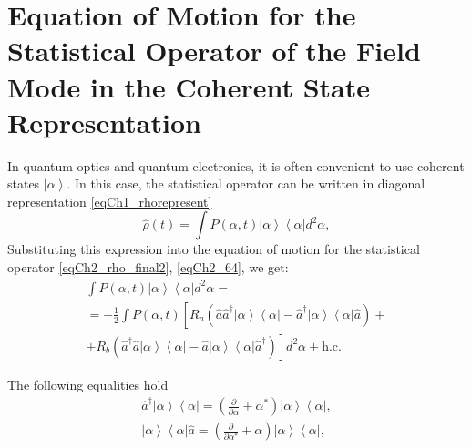 \section{Equation of Motion for the Statistical Operator of the Field Mode in the Coherent State Representation}
In quantum optics and quantum electronics, it is often convenient to use coherent states $\left|\alpha\right>$. In this case, the statistical operator can be written in diagonal representation \eqref{eqCh1_rhorepresent}  
\begin{equation}
\hat{\rho}\left(t\right) = \int
P\left(\alpha, t\right)\left|\alpha\right>\left<\alpha\right| d^2 \alpha,
\label{eqCh2_65}
\end{equation}
Substituting this expression into the equation of motion for the statistical operator \eqref{eqCh2_rho_final2}, \ref{eqCh2_64}, we get: 
\begin{eqnarray}
\int \dot{P}\left(\alpha, t\right)\left|\alpha\right>\left<\alpha\right|
d^2 \alpha  = 
\nonumber \\
= -\frac{1}{2}\int P\left(\alpha, t\right)\left[R_a
\left(\hat{a}\hat{a}^{\dag}\left|\alpha\right>\left<\alpha\right|-\hat{a}^{\dag}\left|\alpha\right>\left<\alpha\right|\hat{a}\right)
\right. +
\nonumber \\
+
\left.
R_b
\left(\hat{a}^{\dag}\hat{a}\left|\alpha\right>\left<\alpha\right|-\hat{a}\left|\alpha\right>\left<\alpha\right|\hat{a}^{\dag}\right)
\right]d^2 \alpha + \text{h.c.}
\label{eqCh2_66}
\end{eqnarray}

The following equalities hold
\begin{eqnarray}
\hat{a}^{\dag}\left|\alpha\right>\left<\alpha\right| = 
\left(\frac{\partial}{\partial \alpha} +
\alpha^{*}\right)\left|\alpha\right>\left<\alpha\right|, 
\nonumber \\
\left|\alpha\right>\left<\alpha\right|\hat{a} = 
\left(\frac{\partial}{\partial \alpha^{*}} +
\alpha\right)\left|\alpha\right>\left<\alpha\right|, 
\label{eqCh2_67}
\end{eqnarray}

